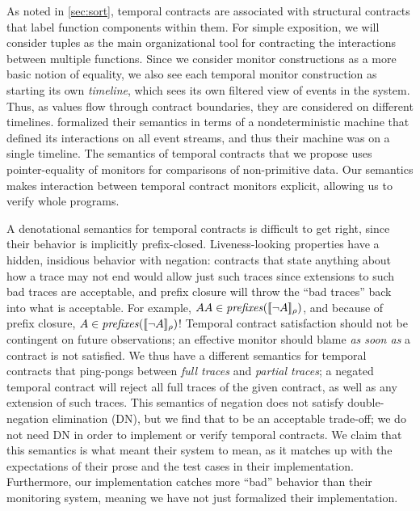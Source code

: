%
As noted in \autoref{sec:sort}, temporal contracts are associated with structural contracts that label function components within them.
%
For simple exposition, we will consider tuples as the main organizational tool for contracting the interactions between multiple functions.
%
Since we consider monitor constructions as a more basic notion of equality, we also see each temporal monitor construction as starting its own \emph{timeline}, which sees its own filtered view of events in the system.
%
Thus, as values flow through contract boundaries, they are considered on different timelines.
%
\dfm formalized their semantics in terms of a nondeterministic machine that defined its interactions on all event streams, and thus their machine was on a single timeline.
%
The semantics of temporal contracts that we propose uses pointer-equality of monitors for comparisons of non-primitive data.
%
Our semantics makes interaction between temporal contract monitors explicit, allowing us to verify whole programs.

A denotational semantics for temporal contracts is difficult to get right, since their behavior is implicitly prefix-closed.
%
Liveness-looking properties have a hidden, insidious behavior with negation: contracts that state anything about how a trace may not end would allow just such traces since extensions to such bad traces are acceptable, and prefix closure will throw the ``bad traces'' back into what is acceptable.
%
For example, $AA \in \mathit{prefixes}([\![ \neg A ]\!]_{\rho})$, and because of prefix closure, $A \in \mathit{prefixes}([\![ \neg A ]\!]_{\rho})$!
%
Temporal contract satisfaction should not be contingent on future observations; an effective monitor should blame \emph{as soon as} a contract is not satisfied.
%
We thus have a different semantics for temporal contracts that ping-pongs between \emph{full traces} and \emph{partial traces}; a negated temporal contract will reject all full traces of the given contract, as well as any extension of such traces.
%
This semantics of negation does not satisfy double-negation elimination (DN), but we find that to be an acceptable trade-off; we do not need DN in order to implement or verify temporal contracts.
%
We claim that this semantics is what \dfm meant their system to mean, as it matches up with the expectations of their prose and the test cases in their implementation.
%
Furthermore, our implementation catches more ``bad'' behavior than their monitoring system, meaning we have not just formalized their implementation.

